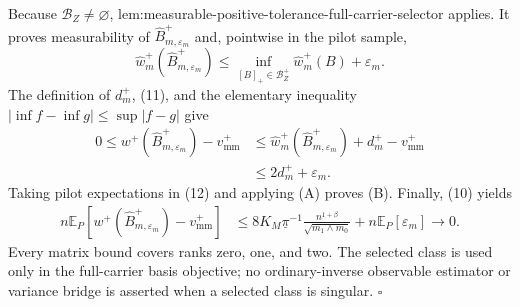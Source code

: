 Because \(\mathcal B_Z\ne\varnothing\), lem:measurable-positive-tolerance-full-carrier-selector applies.  It proves measurability of \(\widehat B_{m,\varepsilon_m}^+\) and, pointwise in the pilot sample,
\[
\widehat w_m^+(\widehat B_{m,\varepsilon_m}^+)
\le\inf_{[B]_+\in\mathcal B_Z^+}\widehat w_m^+(B)+\varepsilon_m.
\tag{11}
\]
The definition of \(d_m^+\), (11), and the elementary inequality \(|\inf f-\inf g|\le\sup|f-g|\) give
\[
\begin{aligned}
0\le w^+(\widehat B_{m,\varepsilon_m}^+)-v_{\mathrm{mm}}^+
&\le \widehat w_m^+(\widehat B_{m,\varepsilon_m}^+)
   +d_m^+-v_{\mathrm{mm}}^+\\
&\le2d_m^++\varepsilon_m.
\end{aligned}
\tag{12}
\]
Taking pilot expectations in (12) and applying (A) proves (B).  Finally, (10) yields
\[
\begin{aligned}
n\mathbb E_P\!\left[
w^+(\widehat B_{m,\varepsilon_m}^+)-v_{\mathrm{mm}}^+
\right]
&\le
8K_M\underline\pi^{-1}
\frac{n^{1+\beta}}{\sqrt{m_1\wedge m_0}}
+n\mathbb E_P[\varepsilon_m]
\longrightarrow0.
\end{aligned}
\]
Every matrix bound covers ranks zero, one, and two.  The selected class is used only in the full-carrier basis objective; no ordinary-inverse observable estimator or variance bridge is asserted when a selected class is singular. \(\square\)